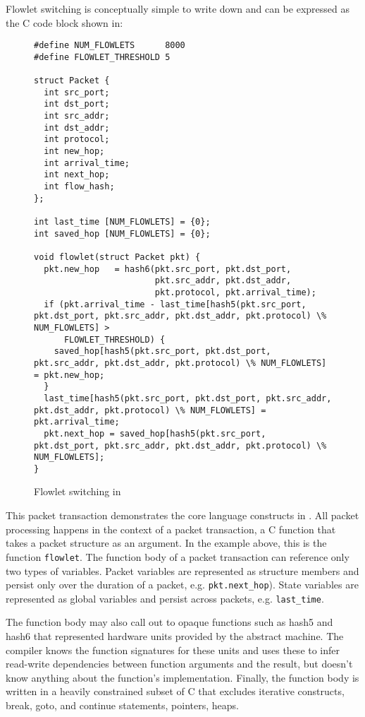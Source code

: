 Flowlet switching is conceptually simple to write down and can be expressed
as the C code block shown in:
\begin{figure}
\begin{scriptsize}
\begin{lstlisting}
#define NUM_FLOWLETS      8000
#define FLOWLET_THRESHOLD 5

struct Packet {
  int src_port;
  int dst_port;
  int src_addr;
  int dst_addr;
  int protocol;
  int new_hop;
  int arrival_time;
  int next_hop;
  int flow_hash;
};

int last_time [NUM_FLOWLETS] = {0};
int saved_hop [NUM_FLOWLETS] = {0};

void flowlet(struct Packet pkt) {
  pkt.new_hop   = hash6(pkt.src_port, pkt.dst_port,
                        pkt.src_addr, pkt.dst_addr,
                        pkt.protocol, pkt.arrival_time);
  if (pkt.arrival_time - last_time[hash5(pkt.src_port, pkt.dst_port, pkt.src_addr, pkt.dst_addr, pkt.protocol) \% NUM_FLOWLETS] >
      FLOWLET_THRESHOLD) {
    saved_hop[hash5(pkt.src_port, pkt.dst_port, pkt.src_addr, pkt.dst_addr, pkt.protocol) \% NUM_FLOWLETS] = pkt.new_hop;
  }
  last_time[hash5(pkt.src_port, pkt.dst_port, pkt.src_addr, pkt.dst_addr, pkt.protocol) \% NUM_FLOWLETS] = pkt.arrival_time;
  pkt.next_hop = saved_hop[hash5(pkt.src_port, pkt.dst_port, pkt.src_addr, pkt.dst_addr, pkt.protocol) \% NUM_FLOWLETS];
}
\end{lstlisting}
\end{scriptsize}
\label{fig:flowlet}
\caption{Flowlet switching in \pktlanguage}
\end{figure}

This packet transaction demonstrates the core language constructs in
\pktlanguage. All packet processing happens in the context of a packet
transaction, a C function that takes a packet structure as an argument.  In the
example above, this is the function \texttt{flowlet}. The function body of a
packet transaction can reference only two types of variables. Packet variables
are represented as structure members and persist only over the duration of a
packet, e.g. \texttt{pkt.next\_hop}). State variables are represented as global
variables and persist across packets, e.g. \texttt{last\_time}.

The function body may also call out to opaque functions such as hash5 and hash6
that represented hardware units provided by the abstract machine. The compiler
knows the function signatures for these units and uses these to infer
read-write dependencies between function arguments and the result, but doesn't
know anything about the function's implementation. Finally, the function body
is written in a heavily constrained subset of C that excludes iterative
constructs, break, goto, and continue statements, pointers, heaps.

